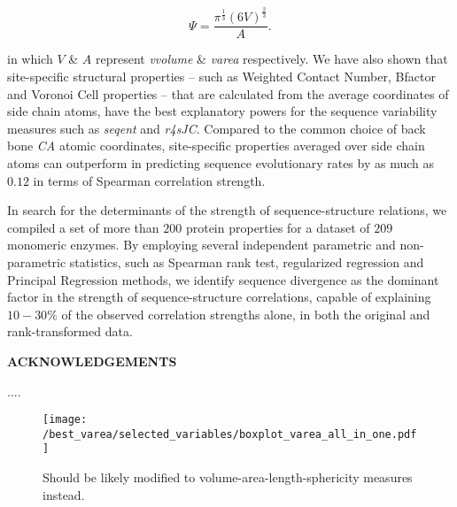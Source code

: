 \documentclass[11pt]{article}
\def\Acknowledgements{\bigskip  \bigskip \begin{center} \begin{large}
             \bf ACKNOWLEDGEMENTS \end{large}\end{center}}
\begin{document}
        \begin{equation}
        \label{eqn:sphericity}
        \Psi = \frac{\pi^{\frac{1}{3}}(6V)^{\frac{2}{3}}}{A}.
        \end{equation}

        in which $V$ \& $A$ represent {\it vvolume} \& {\it varea} respectively. We have also shown that site-specific structural properties -- such as Weighted Contact Number, Bfactor and Voronoi Cell properties -- that are calculated from the average coordinates of side chain atoms, have the best explanatory powers for the sequence variability measures such as {\it seqent} and {\it r4sJC}. Compared to the common choice of back bone {\it CA} atomic coordinates, site-specific properties averaged over side chain atoms can outperform in predicting sequence evolutionary rates by as much as $0.12$ in terms of Spearman correlation strength.

        In search for the determinants of the strength of sequence-structure relations, we compiled a set of more than $200$ protein properties for a dataset of $209$ monomeric enzymes. By employing several independent parametric and non-parametric statistics, such as Spearman rank test, regularized regression and Principal Regression methods, we identify sequence divergence as the dominant factor in the strength of sequence-structure correlations, capable of explaining $10-30\%$ of the observed correlation strengths alone, in both the original and rank-transformed data.


\Acknowledgements

....





    \begin{figure}[tbh]
        \begin{center}
        \texttt{[image: /best\_varea/selected\_variables/boxplot\_varea\_all\_in\_one.pdf]}
        \end{center}
        \caption{Should be likely modified to volume-area-length-sphericity measures instead.}
        \label{fig:best_voronoi}
    \end{figure}
\end{document}
